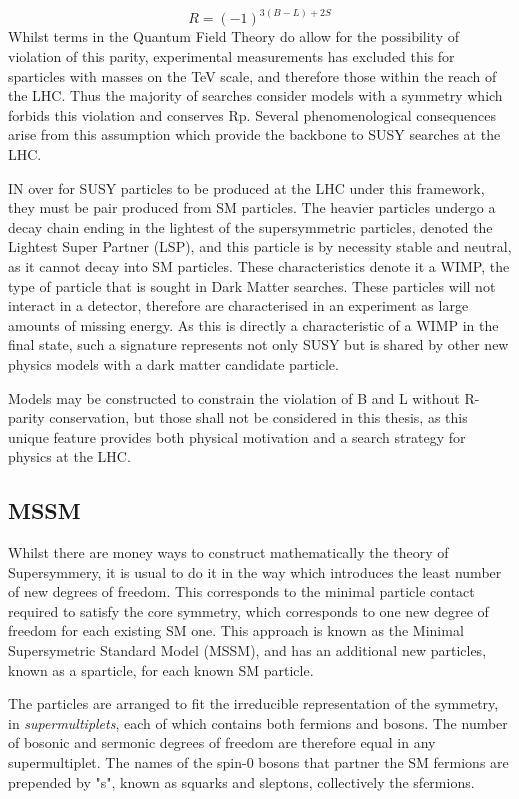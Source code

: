 \begin{equation}
R = (-1)^{3(B-L)+2S}
\label{eqn:RPAR}
\end{equation}
Whilst terms in the Quantum Field Theory do allow for the possibility of violation of this parity, experimental measurements has excluded this for sparticles with masses on the TeV scale, and therefore those within the reach of the LHC. Thus the  majority of searches consider models with a symmetry which forbids this violation and conserves Rp. Several phenomenological consequences arise from this assumption which provide the backbone to SUSY searches at the LHC. 

IN over for SUSY particles to be produced at the LHC under this framework, they must be pair produced from SM particles. The heavier particles undergo a decay chain ending in the lightest of the supersymmetric particles, denoted the Lightest Super Partner (LSP), and this particle is by necessity stable and neutral, as it cannot decay into SM particles. These characteristics denote it a WIMP, the type of particle that is sought in Dark Matter searches.  These particles will not interact in a detector, therefore are characterised in an experiment as large amounts of missing energy. As this is directly a characteristic of a WIMP in the final state, such a signature represents not only SUSY but is shared by other new physics models with a dark matter candidate particle. 

Models may be constructed to constrain the violation of B and L without R-parity conservation, but those shall not be considered in this thesis, as this unique feature provides both physical motivation and a search strategy for physics at the LHC.


\subsection{MSSM} 

Whilst there are money ways to construct mathematically the theory of Supersymmery, it is usual to do it in the way which introduces the least number of new degrees of freedom. This corresponds to the minimal particle contact required to satisfy the core symmetry, which corresponds to one new degree of freedom for each existing SM one. This approach is known as the Minimal Supersymetric Standard Model (MSSM), and has an additional new particles, known as a sparticle, for each known SM particle. 

The particles are arranged to fit the irreducible representation of the symmetry, in \textit{supermultiplets}, each of which contains both fermions and bosons. The number of bosonic and sermonic degrees of freedom are therefore equal in any supermultiplet. The names of the spin-0 bosons that partner the SM fermions are prepended by "s", known as squarks and sleptons, collectively the sfermions. 

